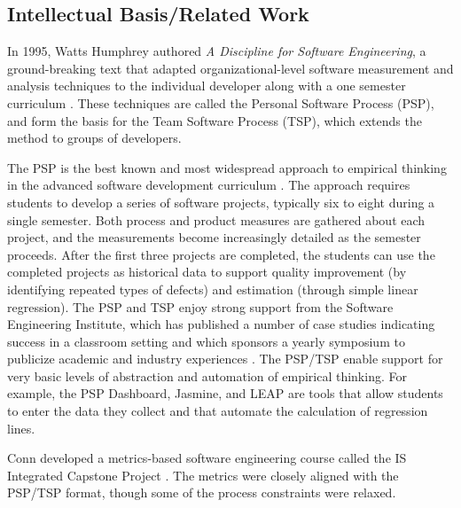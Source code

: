 \subsection{Intellectual Basis/Related Work}
\label{sec:related-work}



In 1995, Watts Humphrey authored {\em A Discipline for Software
Engineering}, a ground-breaking text that adapted organizational-level
software measurement and analysis techniques to the individual developer
along with a one semester curriculum \citep{Humphrey95}. These techniques are called the
Personal Software Process (PSP), and form the basis for the Team Software
Process (TSP), which extends the method to groups of developers. 

The PSP is the best known and most widespread approach to empirical
thinking in the advanced software development curriculum
\citep{Maletic01,Abrahamsson02,Lisack00,Carrington01,Ceberio-Verghese96,Borstler02}.  The approach
requires students to develop a series of software projects, typically six
to eight during a single semester.  Both process and product measures are
gathered about each project, and the measurements become increasingly
detailed as the semester proceeds. After the first three projects are
completed, the students can use the completed projects as historical data
to support quality improvement (by identifying repeated types of defects)
and estimation (through simple linear regression).  The PSP and TSP enjoy
strong support from the Software Engineering Institute, which has published
a number of case studies indicating success in a classroom setting and
which sponsors a yearly symposium to publicize academic and industry
experiences \citep{Ferguson97,Hayes97}.  The PSP/TSP enable support for very basic levels of
abstraction and automation of empirical thinking. For example, the PSP
Dashboard, Jasmine, and LEAP are tools that allow students to enter the
data they collect and that automate the calculation of regression lines.

Conn developed a metrics-based software engineering course called the 
IS Integrated Capstone Project \citep{Conn04}.  The metrics were closely aligned
with the PSP/TSP format, though some of the process constraints were relaxed. 

